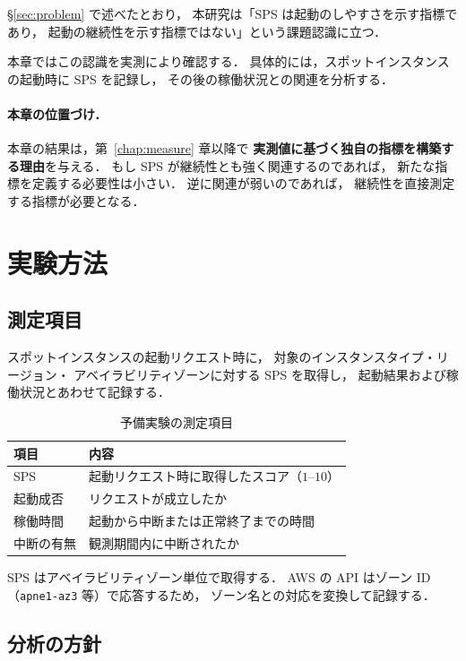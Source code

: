 \documentclass[11pt,a4paper]{ltjsreport}
\begin{document}
\S\ref{sec:problem} で述べたとおり，
本研究は「SPS は起動のしやすさを示す指標であり，
起動の継続性を示す指標ではない」という課題認識に立つ．

本章ではこの認識を実測により確認する．
具体的には，スポットインスタンスの起動時に SPS を記録し，
その後の稼働状況との関連を分析する．

\paragraph{本章の位置づけ．}
本章の結果は，第~\ref{chap:measure} 章以降で
\textbf{実測値に基づく独自の指標を構築する理由}を与える．
もし SPS が継続性とも強く関連するのであれば，
新たな指標を定義する必要性は小さい．
逆に関連が弱いのであれば，
継続性を直接測定する指標が必要となる．

\section{実験方法}

\subsection{測定項目}

スポットインスタンスの起動リクエスト時に，
対象のインスタンスタイプ・リージョン・
アベイラビリティゾーンに対する SPS を取得し，
起動結果および稼働状況とあわせて記録する．

\begin{table}[htbp]
\centering
\caption{予備実験の測定項目}
\label{tab:prelim_items}
\small
\begin{tabularx}{\textwidth}{@{}lX@{}}
\toprule
項目 & 内容 \\
\midrule
SPS & 起動リクエスト時に取得したスコア（$1$--$10$） \\
起動成否 & リクエストが成立したか \\
稼働時間 & 起動から中断または正常終了までの時間 \\
中断の有無 & 観測期間内に中断されたか \\
\bottomrule
\end{tabularx}
\end{table}

SPS はアベイラビリティゾーン単位で取得する．
AWS の API はゾーン ID（\texttt{apne1-az3} 等）で応答するため，
ゾーン名との対応を変換して記録する．

\subsection{分析の方針}
\end{document}
